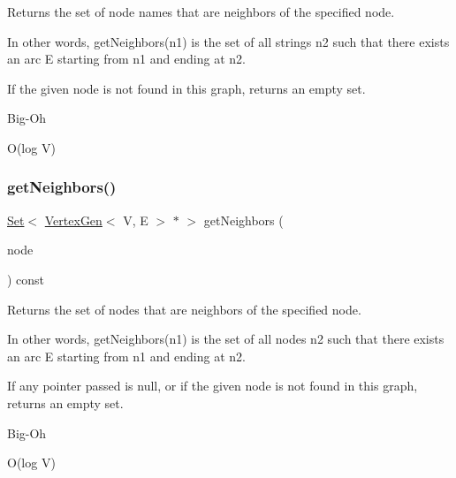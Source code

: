 Returns the set of node names that are neighbors of the specified node. 

In other words, get\+Neighbors(n1) is the set of all strings n2 such that there exists an arc E starting from n1 and ending at n2.

If the given node is not found in this graph, returns an empty set. \begin{DoxyRefDesc}{Big-\/\+Oh}
\item[\mbox{\hyperlink{BigOh__BigOh000072}{Big-\/\+Oh}}]O(log V) \end{DoxyRefDesc}
\mbox{\label{classGraph_a0e49b167f0623a8ae76040c3e5eab3fb}} 
\subsubsection{\texorpdfstring{get\+Neighbors()}{getNeighbors()}\hspace{0.1cm}{\footnotesize\ttfamily [1/2]}}
{\footnotesize\ttfamily \mbox{\hyperlink{classstanfordcpplib_1_1collections_1_1GenericSet}{Set}}$<$ \mbox{\hyperlink{classVertexGen}{Vertex\+Gen}}$<$ V, E $>$  $\ast$ $>$ get\+Neighbors (\begin{DoxyParamCaption}\item[{\mbox{\hyperlink{classVertexGen}{Vertex\+Gen}}$<$ V, E $>$  $\ast$}]{node }\end{DoxyParamCaption}) const\hspace{0.3cm}{\ttfamily [inherited]}}



Returns the set of nodes that are neighbors of the specified node. 

In other words, get\+Neighbors(n1) is the set of all nodes n2 such that there exists an arc E starting from n1 and ending at n2.

If any pointer passed is null, or if the given node is not found in this graph, returns an empty set. \begin{DoxyRefDesc}{Big-\/\+Oh}
\item[\mbox{\hyperlink{BigOh__BigOh000073}{Big-\/\+Oh}}]O(log V) \end{DoxyRefDesc}
\mbox{\label{classGraph_a3a3720906c380f36b50530419330bfe5}} 
